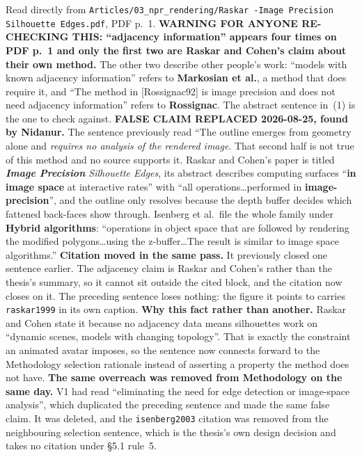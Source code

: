 \documentclass[11pt, a4paper]{article}
\begin{document}
\begin{Form}
  {Read directly from \texttt{\footnotesize Articles/03\_npr\_rendering/Raskar -Image Precision Silhouette Edges.pdf}, PDF p.~1. \textbf{WARNING FOR ANYONE RE-CHECKING THIS: ``adjacency information'' appears four times on PDF p.~1 and only the first two are Raskar and Cohen's claim about their own method.} The other two describe other people's work: ``models with known adjacency information'' refers to \textbf{Markosian et al.}, a method that does require it, and ``The method in [Rossignac92] is image precision and does not need adjacency information'' refers to \textbf{Rossignac}. The abstract sentence in~(1) is the one to check against. \textbf{FALSE CLAIM REPLACED 2026-08-25, found by Nidanur.} The sentence previously read ``The outline emerges from geometry alone and \emph{requires no analysis of the rendered image}. That second half is not true of this method and no source supports it. Raskar and Cohen's paper is titled \emph{\textbf{Image Precision} Silhouette Edges}, its abstract describes computing surfaces ``\textbf{in image space} at interactive rates'' with ``all operations\ldots performed in \textbf{image-precision}'', and the outline only resolves because the depth buffer decides which fattened back-faces show through. Isenberg et al.\ file the whole family under \textbf{Hybrid algorithms}: ``operations in object space that are followed by rendering the modified polygons\ldots using the z-buffer\ldots The result is similar to image space algorithms.'' \textbf{Citation moved in the same pass.} It previously closed one sentence earlier. The adjacency claim is Raskar and Cohen's rather than the thesis's summary, so it cannot sit outside the cited block, and the citation now closes on it. The preceding sentence loses nothing: the figure it points to carries \texttt{raskar1999} in its own caption. \textbf{Why this fact rather than another.} Raskar and Cohen state it because no adjacency data means silhouettes work on ``dynamic scenes, models with changing topology''. That is exactly the constraint an animated avatar imposes, so the sentence now connects forward to the Methodology selection rationale instead of asserting a property the method does not have. \textbf{The same overreach was removed from Methodology on the same day.} V1 had read ``eliminating the need for edge detection or image-space analysis'', which duplicated the preceding sentence and made the same false claim. It was deleted, and the \texttt{isenberg2003} citation was removed from the neighbouring selection sentence, which is the thesis's own design decision and takes no citation under \S5.1 rule~5.}


\end{Form}
\end{document}
